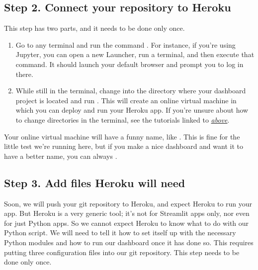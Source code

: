 \documentclass[letterpaper,10pt,english]{sphinxmanual}
\begin{document}
\subsection{Step 2. Connect your repository to Heroku}
\label{\detokenize{chapter-14-dashboards:step-2-connect-your-repository-to-heroku}}
This step has two parts, and it needs to be done only once.
\begin{enumerate}
%
\item {} 
  Go to any terminal and run the command .  For instance, if you’re using Jupyter, you can open a new Launcher, run a terminal, and then execute that command.  It should launch your default browser and prompt you to log in there.

\item {} 
  While still in the terminal, change into the directory where your dashboard project is located and run .  This will create an online virtual machine in which you can deploy and run your Heroku app.  If you’re unsure about how to change directories in the terminal, see the tutorials linked to {\hyperref[\detokenize{chapter-14-dashboards:Step-2.-Converting-your-script-to-use-Streamlit}]{\emph{above}}}.

\end{enumerate}

Your online virtual machine will have a funny name, like .  This is fine for the little test we’re running here, but if you make a nice dashboard and want it to have a better name, you can always .


\subsection{Step 3. Add files Heroku will need}
\label{\detokenize{chapter-14-dashboards:step-3-add-files-heroku-will-need}}
Soon, we will push your git repository to Heroku, and expect Heroku to run your app.  But Heroku is a very generic tool; it’s not for Streamlit apps only, nor even for just Python apps.  So we cannot expect Heroku to know what to do with our Python script.  We will need to tell it how to set itself up with the necessary Python modules and how to run our dashboard once it has done so.  This requires putting three configuration files into our git repository.  This step needs to be done only once.
\end{document}
